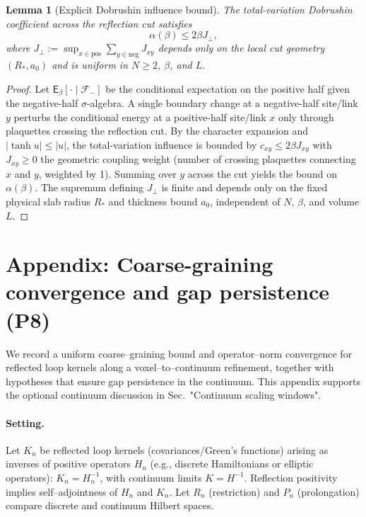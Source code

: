 \documentclass[11pt]{amsart}
\theoremstyle{plain}
\newtheorem{lemma}[theorem]{Lemma}
\theoremstyle{definition}
\theoremstyle{remark}
\begin{document}
\begin{lemma}[Explicit Dobrushin influence bound]\label{lem:dob-influence}
The total-variation Dobrushin coefficient across the reflection cut satisfies
\[
\alpha(\beta) \le 2\beta J_{\perp},
\]
where $J_{\perp} := \sup_{x \in \text{pos}} \sum_{y \in \text{neg}} J_{xy}$ depends only on the local cut geometry $(R_*, a_0)$ and is uniform in $N \ge 2$, $\beta$, and $L$.
\end{lemma}
\begin{proof}
Let $\mathsf{E}_\beta[\cdot \mid \mathcal{F}_{-}]$ be the conditional expectation on the positive half given the negative-half $\sigma$-algebra. A single boundary change at a negative-half site/link $y$ perturbs the conditional energy at a positive-half site/link $x$ only through plaquettes crossing the reflection cut. By the character expansion and $|\tanh u| \le |u|$, the total-variation influence is bounded by $c_{xy} \le 2\beta J_{xy}$ with $J_{xy} \ge 0$ the geometric coupling weight (number of crossing plaquettes connecting $x$ and $y$, weighted by 1). Summing over $y$ across the cut yields the bound on $\alpha(\beta)$. The supremum defining $J_{\perp}$ is finite and depends only on the fixed physical slab radius $R_*$ and thickness bound $a_0$, independent of $N$, $\beta$, and volume $L$.
\end{proof}

\section{Appendix: Coarse-graining convergence and gap persistence (P8)}

We record a uniform coarse--graining bound and operator--norm convergence for reflected loop kernels along a voxel--to--continuum refinement, together with hypotheses that ensure gap persistence in the continuum. This appendix supports the optional continuum discussion in Sec.~"Continuum scaling windows".

\paragraph{Setting.}
Let $K_n$ be reflected loop kernels (covariances/Green's functions) arising as inverses of positive operators $H_n$ (e.g., discrete Hamiltonians or elliptic operators): $K_n=H_n^{-1}$, with continuum limits $K=H^{-1}$. Reflection positivity implies self--adjointness of $H_n$ and $K_n$. Let $R_n$ (restriction) and $P_n$ (prolongation) compare discrete and continuum Hilbert spaces.
\end{document}
